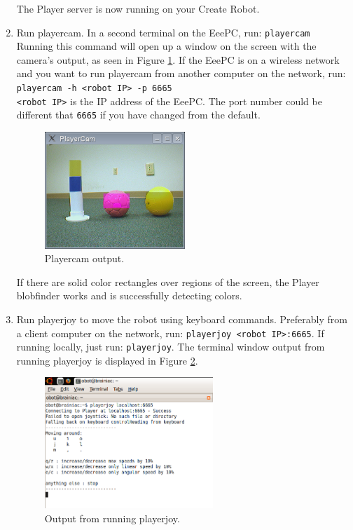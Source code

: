 \begin{enumerate}
The Player server is now running on your Create Robot.

\item Run playercam. In a second terminal on the EeePC, run: \texttt{playercam}\\
Running this command will open up a window on the screen with the camera's output, as seen in Figure \ref{fig:2_playercam}. If the EeePC is on a wireless network and you want to run playercam from another computer on the network, run:\\
\texttt{playercam -h <robot IP> -p 6665} \\
\texttt{<robot IP>} is the IP address of the EeePC. The port number could be different that \texttt{6665} if you have changed from the default. 

\begin{figure}[!h]
\centering
\includegraphics[width=0.5\textwidth]{figures/2_blobs.png}
\caption{Playercam output.}
\label{fig:2_playercam}
\end{figure}

If there are solid color rectangles over regions of the screen, the Player blobfinder works and is successfully detecting colors.

\item Run playerjoy to move the robot using keyboard commands. Preferably from a client computer on the network, run: \texttt{playerjoy <robot IP>:6665}. If running locally, just run: \texttt{playerjoy}. The terminal window output from running playerjoy is displayed in Figure \ref{fig:playerjoy}.
\begin{figure}[!h]
\centering
\includegraphics[width=0.6\textwidth]{figures/2_playerjoy.png}
\caption{Output from running playerjoy.}
\label{fig:playerjoy}
\end{figure}
 

\end{enumerate}
